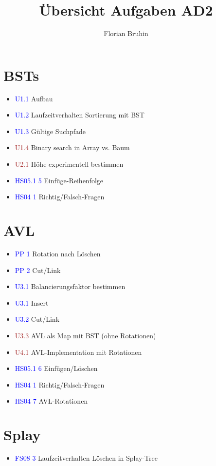\documentclass[a4paper,12pt]{article}
\newcommand{\ub}[1]{\textcolor{blue}{#1}}
\newcommand{\ubc}[1]{\textcolor{brown}{#1}}
\begin{document}
\title{Übersicht Aufgaben AD2}
\author{Florian Bruhin}
\maketitle

\section{BSTs}

\begin{itemize}
  \item \ub{U1.1} Aufbau
  \item \ub{U1.2} Laufzeitverhalten Sortierung mit BST
  \item \ub{U1.3} Gültige Suchpfade
  \item \ubc{U1.4} Binary search in Array vs. Baum
  \item \ubc{U2.1} Höhe experimentell bestimmen
  \item \ub{HS05.1 5} Einfüge-Reihenfolge
  \item \ub{HS04 1} Richtig/Falsch-Fragen
\end{itemize}

\section{AVL}

\begin{itemize}
  \item \ub{PP 1} Rotation nach Löschen
  \item \ub{PP 2} Cut/Link
  \item \ub{U3.1} Balancierungsfaktor bestimmen
  \item \ub{U3.1} Insert
  \item \ub{U3.2} Cut/Link
  \item \ubc{U3.3} AVL als Map mit BST (ohne Rotationen)
  \item \ubc{U4.1} AVL-Implementation mit Rotationen
  \item \ub{HS05.1 6} Einfügen/Löschen
  \item \ub{HS04 1} Richtig/Falsch-Fragen
  \item \ub{HS04 7} AVL-Rotationen
\end{itemize}

\section{Splay}

\begin{itemize}
  \item \ub{FS08 3} Laufzeitverhalten Löschen in Splay-Tree
\end{itemize}
\end{document}
